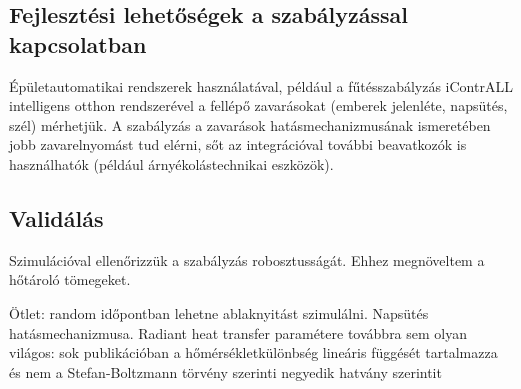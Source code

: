 \subsection{Fejlesztési lehetőségek a szabályzással kapcsolatban}
	
Épületautomatikai rendszerek használatával, például a fűtésszabályzás iContrALL intelligens otthon rendszerével a fellépő zavarásokat (emberek jelenléte, napsütés, szél) mérhetjük. A szabályzás a zavarások hatásmechanizmusának ismeretében jobb zavarelnyomást tud elérni, sőt az integrációval további beavatkozók is használhatók (például árnyékolástechnikai eszközök).



\subsection{Validálás}
Szimulációval ellenőrizzük a szabályzás robosztusságát. Ehhez megnöveltem a hőtároló tömegeket.

Ötlet: random időpontban lehetne ablaknyitást szimulálni.
Napsütés hatásmechanizmusa.
Radiant heat transfer paramétere továbbra sem olyan világos: sok publikációban a hőmérsékletkülönbség lineáris függését tartalmazza és nem a Stefan-Boltzmann törvény szerinti negyedik hatvány szerintit

